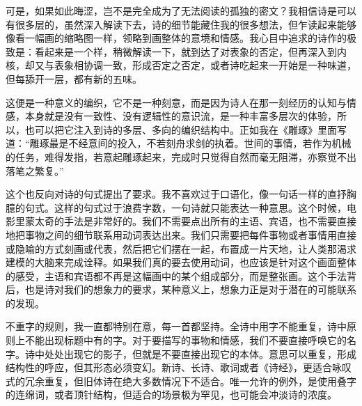 \documentclass{article}
\begin{document}
可是，如果如此晦涩，岂不是完全成为了无法阅读的孤独的密文？我相信诗是可以有很多层的，虽然深入解读下去，诗的细节能藏住我的很多想法，但乍读起来能够像看一幅画的缩略图一样，领略到画整体的意境和情感。我心目中追求的诗作的极致是：看起来是一个样，稍微解读一下，就到达了对表象的否定，但再深入到内核，却又与表象相协调一致，形成否定之否定，或者诗吃起来一开始是一种味道，但每舔开一层，都有新的五味。

这便是一种意义的编织，它不是一种刻意，而是因为诗人在那一刻经历的认知与情感，本身就是没有一致性、没有逻辑性的意识流，是一种丰富多层次的体验，所以，也可以把它注入到诗的多层、多向的编织结构中。正如我在《雕琢》里面写道：``雕琢最是不经意间的投入，不若刻舟求剑的执着。世间的事情，若作为机械的任务，难得发指，若意起雕琢起来，完成时只觉得自然而毫无阻滞，亦察觉不出落笔之繁复。''

这个也反向对诗的句式提出了要求。我不喜欢过于口语化，像一句话一样的直抒胸臆的句式。这样的句式过于浪费字数，一句诗就只能表达一种意思。这个时候，电影里蒙太奇的手法是非常好的。我们不需要点出所有的主语、宾语，也不需要直接地把事物之间的细节联系用动词表达出来。我们只需要把每件事物或者事情用直接或隐喻的方式刻画或代表，然后把它们摆在一起，布置成一片天地，让人类那渴求建模的大脑来完成诠释。如果我们真的要去使用动词，也应该是针对这个画面整体的感受，主语和宾语都不再是这幅画中的某个组成部分，而是整张画。这个手法背后，也是诗对我们的想象力的要求，某种意义上，想象力正是对于潜在的可能联系的发现。

不重字的规则，我一直都特别在意，每一首都坚持。全诗中用字不能重复，诗中原则上不能出现标题中有的字。对于要描写的事物和情感，我们不要直接呼唤它的名字。诗中处处出现它的影子，但就是不要直接出现它的本体。意思可以重复，形成结构性的呼应，但其形态必须变幻。新诗、长诗、歌词或者《诗经》，更适合咏叹式的冗余重复，但旧体诗在绝大多数情况下不适合。唯一允许的例外，是使用叠字的连绵词，或者顶针结构，但适合的场景极为罕见，也可能会冲淡诗的浓度。
\end{document}
